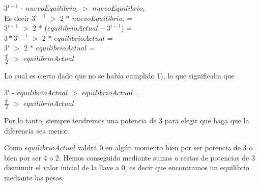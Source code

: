 \begin{center}

$3^{i-1}$ - $nuevoEquilibrio_{i}$ $>$ $nuevoEquilibrio_{i}$ \\

Es decir $3^{i-1}$ $>$ 2 $\ast$ $nuevoEquilibrio_{i}$ = \\

$3^{i-1}$ $>$ 2 $\ast$ ($equilibrioActual - 3^{i-1}$) =  \\

$3\ast3^{i-1}$ $>$ 2 $\ast$ $equilibrioActual$ = \\

$3^{i}$ $>$ 2 $\ast$ $equilibrioActual$ = \\

$\frac{3^{i}}{2}$ $>$ $equilibrioActual$ \\

\end{center}

Lo cual es cierto dado que no se había cumplido 1), lo que significaba que  \\

\begin{center}

$3^i$ - $equilibrioActual$ $>$ $equilibrioActual$ = \\

$\frac{3^i}{2}$ $>$ $equilibrioActual$ \\

\end{center}

Por lo tanto, siempre tendremos una potencia de 3 para elegir que haga que la diferencia sea menor.

Como $equilibrioActual$ valdrá 0 en algún momento bien por ser potencia de 3 o bien por ser 4 o 2.
Hemos conseguido mediante sumas o restas de potencias de 3 disminuir el valor inicial de la llave a  0, es decir que encontramos un equilibrio mediante las pesas.